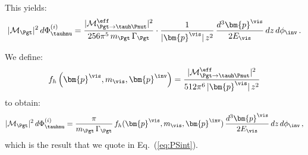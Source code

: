 This yields:
\begin{equation}
 \vert\mathcal{M}_{\Pgt}\vert^{2} \,
 d\Phi^{(i)}_{\tauhnu} = \frac{\vert\mathcal{M}^{\eff}_{\Pgt \to
  \tauh\Pnut}\vert^{2}}{256\pi^{5}\, m_{\Pgt} \, \Gamma_{\Pgt}} \cdot 
    \frac{1}{\vert\bm{p}^{\vis}\vert \, z^{2}} \, 
    \frac{d^{3}\bm{p}^{\vis}}{2 E_{\vis}} \, dz \, d\phi_{\inv} \, .
\label{eq:hadTauDecaysResult}
\end{equation}

We define:
\begin{equation}
f_{h}\left(\bm{p}^{\vis}, m_{\vis}, \bm{p}^{\inv}\right) = 
  \frac{\vert\mathcal{M}^{\eff}_{\Pgt \to
  \tauh\Pnut}\vert^{2}}{512\pi^{6} \, \vert\bm{p}^{\vis}\vert \, z^{2}} 
\label{eq:hadTauDecays_f}
\end{equation}
to obtain:
\begin{equation}
\vert\mathcal{M}_{\Pgt}\vert^{2} \,
 d\Phi^{(i)}_{\tauhnu} = \frac{\pi}{m_{\Pgt} \, \Gamma_{\Pgt}} \,
 f_{h}(\bm{p}^{\vis}, m_{\vis}, \bm{p}^{\inv}) \, \frac{d^{3}\bm{p}^{\vis}}{2 E_{\vis}} \, dz \, d\phi_{\inv}
 \, ,
\end{equation}
which is the result that we quote in Eq.~(\ref{eq:PSint}).
